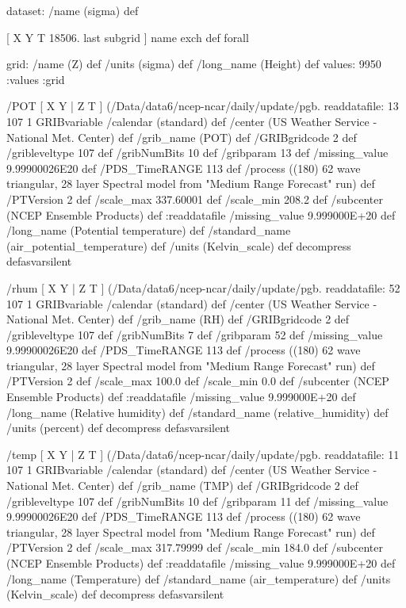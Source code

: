 \begin{ingrid}

 dataset: /name (sigma) def 

  [ X Y T 18506. last subgrid ] { name exch def } forall

  grid:
  /name (Z) def
  /units (sigma) def
  /long_name (Height) def
  values: 9950 :values 
  :grid

  /POT { [ X Y | Z T ] (/Data/data6/ncep-ncar/daily/update/pgb.%
  readdatafile:
  13 107 1 GRIBvariable
  /calendar (standard) def
  /center (US Weather Service - National Met. Center) def
  /grib_name (POT) def
  /GRIBgridcode 2 def
  /gribleveltype 107 def
  /gribNumBits 10 def
  /gribparam 13 def
  /missing_value 9.99900026E20 def
  /PDS_TimeRANGE 113 def
  /process ((180) 62 wave triangular, 28 layer Spectral model from "Medium Range Forecast" run) def
  /PTVersion 2 def
  /scale_max 337.60001 def
  /scale_min 208.2 def
  /subcenter (NCEP Ensemble Products) def
  :readdatafile
  /missing_value 9.999000E+20 def
  /long_name (Potential temperature) def
  /standard_name (air_potential_temperature) def
  /units (Kelvin_scale) def
  decompress
  } defasvarsilent

  /rhum { [ X Y | Z T ] (/Data/data6/ncep-ncar/daily/update/pgb.%
  readdatafile:
  52 107 1 GRIBvariable
  /calendar (standard) def
  /center (US Weather Service - National Met. Center) def
  /grib_name (RH) def
  /GRIBgridcode 2 def
  /gribleveltype 107 def
  /gribNumBits 7 def
  /gribparam 52 def
  /missing_value 9.99900026E20 def
  /PDS_TimeRANGE 113 def
  /process ((180) 62 wave triangular, 28 layer Spectral model from "Medium Range Forecast" run) def
  /PTVersion 2 def
  /scale_max 100.0 def
  /scale_min 0.0 def
  /subcenter (NCEP Ensemble Products) def
  :readdatafile
  /missing_value 9.999000E+20 def
  /long_name (Relative humidity) def
  /standard_name (relative_humidity) def
  /units (percent) def
  decompress
  } defasvarsilent

  /temp { [ X Y | Z T ] (/Data/data6/ncep-ncar/daily/update/pgb.%
  readdatafile:
  11 107 1 GRIBvariable
  /calendar (standard) def
  /center (US Weather Service - National Met. Center) def
  /grib_name (TMP) def
  /GRIBgridcode 2 def
  /gribleveltype 107 def
  /gribNumBits 10 def
  /gribparam 11 def
  /missing_value 9.99900026E20 def
  /PDS_TimeRANGE 113 def
  /process ((180) 62 wave triangular, 28 layer Spectral model from "Medium Range Forecast" run) def
  /PTVersion 2 def
  /scale_max 317.79999 def
  /scale_min 184.0 def
  /subcenter (NCEP Ensemble Products) def
  :readdatafile
  /missing_value 9.999000E+20 def
  /long_name (Temperature) def
  /standard_name (air_temperature) def
  /units (Kelvin_scale) def
  decompress
  } defasvarsilent


\end{ingrid}
